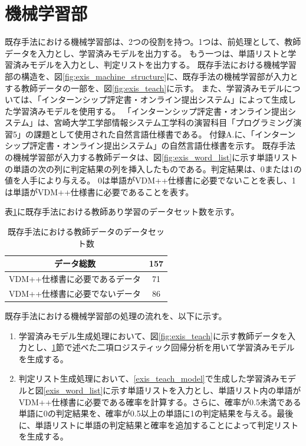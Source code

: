 \section{機械学習部}
既存手法における機械学習部は、2つの役割を持つ。1つは、前処理として、教師データを入力とし、学習済みモデルを出力する。
もう一つは、単語リストと学習済みモデルを入力とし、判定リストを出力する。
既存手法における機械学習部の構造を、図\ref{fig:exis_machine_structure}に、既存手法の機械学習部が入力とする教師データの一部を、図\ref{fig:exis_teach}に示す。
また、学習済みモデルについては、「インターンシップ評定書・オンライン提出システム」によって生成した学習済みモデルを使用する。
「インターンシップ評定書・オンライン提出システム」は、宮崎大学工学部情報システム工学科の演習科目「プログラミング演習5」の課題として使用された自然言語仕様書である。
付録A.に、「インターンシップ評定書・オンライン提出システム」の自然言語仕様書を示す。
既存手法の機械学習部が入力する教師データは、図\ref{fig:exis_word_list}に示す単語リストの単語の次の列に判定結果の列を挿入したものである。判定結果は、0または1の値を人手により与える。
0は単語がVDM++仕様書に必要でないことを表し、1は単語がVDM++仕様書に必要であることを表す。

表\ref{table:exis_data_set}に既存手法における教師あり学習のデータセット数を示す。

\begin{table}[t]
    \begin{center}
      \caption{既存手法における教師データのデータセット数}
      \label{table:exis_data_set}
      \begin{tabular}{c|c}
        データ総数　& 157\\
        \hline
        \hline
        VDM++仕様書に必要であるデータ    & 71\\ \hline
        VDM++仕様書に必要でないデータ & 86\\ \hline
      \end{tabular}
    \end{center}
  \end{table}

既存手法における機械学習部の処理の流れを、以下に示す。

\begin{enumerate}
    \item 学習済みモデル生成処理において、図\ref{fig:exis_teach}に示す教師データを入力とし、\ref{}節で述べた二項ロジスティック回帰分析を用いて学習済みモデルを生成する。
    \label{exis_teach_model}
    \item 判定リスト生成処理において、\ref{exis_teach_model}で生成した学習済みモデルと図\ref{exis_word_list}に示す単語リストを入力とし、単語リスト内の単語がVDM++仕様書に必要である確率を計算する。さらに、確率が0.5未満である単語に0の判定結果を、確率が0.5以上の単語に1の判定結果を与える。最後に、単語リストに単語の判定結果と確率を追加することによって判定リストを生成する。
\end{enumerate}

